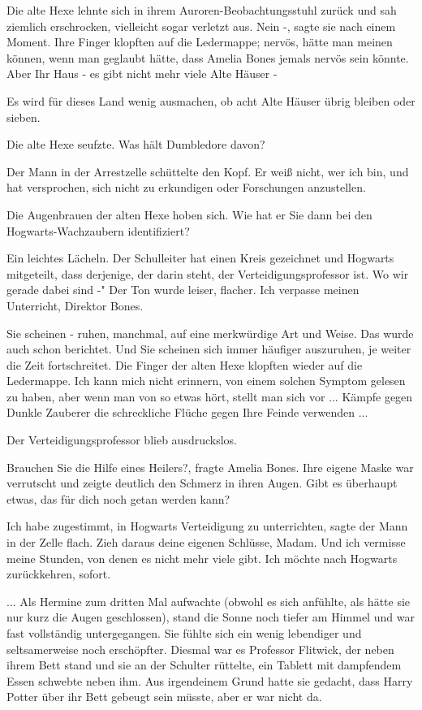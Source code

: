 Die alte Hexe lehnte sich in ihrem Auroren-Beobachtungsstuhl zurück und sah
ziemlich erschrocken, vielleicht sogar verletzt aus. \glqq Nein -\grqq{}, sagte
sie nach einem Moment. Ihre Finger klopften auf die Ledermappe; nervös, hätte
man meinen können, wenn man geglaubt hätte, dass Amelia Bones jemals nervös sein
könnte. \glqq Aber Ihr Haus - es gibt nicht mehr viele Alte Häuser -\grqq{}

\glqq Es wird für dieses Land wenig ausmachen, ob acht Alte Häuser übrig bleiben
oder sieben.\grqq{}

Die alte Hexe seufzte. \glqq Was hält Dumbledore davon?\grqq{}

Der Mann in der Arrestzelle schüttelte den Kopf. \glqq Er weiß nicht, wer ich
bin, und hat versprochen, sich nicht zu erkundigen oder Forschungen
anzustellen.\grqq{}

Die Augenbrauen der alten Hexe hoben sich. \glqq Wie hat er Sie dann bei den
Hogwarts-Wachzaubern identifiziert?\grqq{}

Ein leichtes Lächeln. \glqq Der Schulleiter hat einen Kreis gezeichnet und
Hogwarts mitgeteilt, dass derjenige, der darin steht, der Verteidigungsprofessor
ist. Wo wir gerade dabei sind -" Der Ton wurde leiser, flacher. \glqq Ich
verpasse meinen Unterricht, Direktor Bones.\grqq{}

\glqq Sie scheinen - ruhen, manchmal, auf eine merkwürdige Art und Weise. Das
wurde auch schon berichtet. Und Sie scheinen sich immer häufiger auszuruhen, je
weiter die Zeit fortschreitet.\grqq{} Die Finger der alten Hexe klopften wieder
auf die Ledermappe. \glqq Ich kann mich nicht erinnern, von einem solchen
Symptom gelesen zu haben, aber wenn man von so etwas hört, stellt man sich vor
... Kämpfe gegen Dunkle Zauberer die schreckliche Flüche gegen Ihre Feinde
verwenden ...\grqq{}

Der Verteidigungsprofessor blieb ausdruckslos.

\glqq Brauchen Sie die Hilfe eines Heilers?\grqq{}, fragte Amelia Bones. Ihre
eigene Maske war verrutscht und zeigte deutlich den Schmerz in ihren Augen.
\glqq Gibt es überhaupt etwas, das für dich noch getan werden kann?\grqq{}

\glqq Ich habe zugestimmt, in Hogwarts Verteidigung zu unterrichten\grqq{},
sagte der Mann in der Zelle flach. \glqq Zieh daraus deine eigenen Schlüsse,
Madam. Und ich vermisse meine Stunden, von denen es nicht mehr viele gibt. Ich
möchte nach Hogwarts zurückkehren, sofort.\grqq{}


... Als Hermine zum dritten Mal aufwachte (obwohl es sich anfühlte, als hätte
sie nur kurz die Augen geschlossen), stand die Sonne noch tiefer am Himmel und
war fast vollständig untergegangen. Sie fühlte sich ein wenig lebendiger und
seltsamerweise noch erschöpfter. Diesmal war es Professor Flitwick, der neben
ihrem Bett stand und sie an der Schulter rüttelte, ein Tablett mit dampfendem
Essen schwebte neben ihm. Aus irgendeinem Grund hatte sie gedacht, dass Harry
Potter über ihr Bett gebeugt sein müsste, aber er war nicht da.

